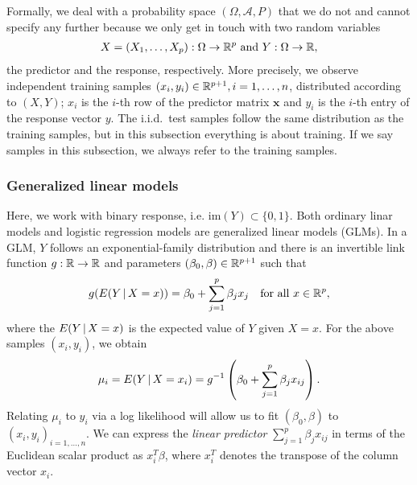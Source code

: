 Formally, we deal with a probability space $(\Omega, \mathcal{A}, P)$ that we do not and cannot 
specify any further because we only get in touch with two random variables 
\begin{align}
    X = (X_1, \ldots, X_p): \Omega \to \mathbb{R}^p \text{ and } Y: \Omega \to \mathbb{R},
\end{align}
the predictor and the response, respectively. More 
precisely, we observe independent training samples $(x_i, y_i) \in \mathbb{R}^{p+1}, i = 1, \ldots, n$, 
distributed according to $(X, Y)$; $x_i$ is the $i$-th row of the predictor matrix $\mathbf{x}$ and
$y_i$ is the $i$-th entry of the response vector $y$. The i.i.d.\ test samples follow the same 
distribution as the training samples, but in this subsection everything is about training. If we 
say samples in this subsection, we always refer to the training samples.

\subsubsection{Generalized linear models}\label{subsubsec:glm}

Here, we work with binary response, i.e. $\mathrm{im}(Y) \subset \{0, 1\}$. Both ordinary 
linar models and logistic regression models are generalized linear models (GLMs). In 
a GLM, $Y$ follows an exponential-family distribution and there is an invertible link function 
$g: \mathbb{R} \to \mathbb{R}$ and parameters $(\beta_0, \beta) \in \mathbb{R}^{p+1}$ such that
\begin{align}
    g(E(Y \,|\, X = x)) = \beta_0 + \sum_{j=1}^p \beta_j x_j \quad \text{for all } x \in \mathbb{R}^p,
\end{align}
where the $E(Y \,|\, X = x)$ is the expected value of $Y$ given $X = x$. For the above samples 
$(x_i, y_i)$, we obtain
\begin{align}
    \mu_i = E(Y \,|\, X = x_i) = g^{-1}\left(\beta_0 + \sum_{j=1}^p \beta_j x_{ij}\right).
\end{align}
Relating $\mu_i$ to $y_i$ via a log likelihood will allow us to fit $(\beta_0, \beta)$ to 
$(x_i, y_i)_{i = 1, \ldots, n}$. We can express the \textit{linear predictor} 
$\sum_{j=1}^p \beta_j x_{ij}$ in terms of the Euclidean scalar product as $x_i^T \beta$, where 
$x_i^T$ denotes the transpose of the column vector $x_i$.

